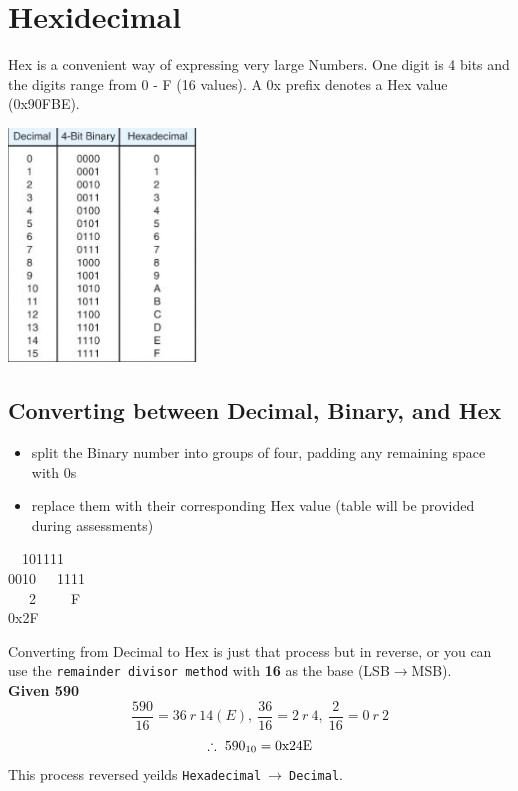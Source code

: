 \documentclass[a4paper,12pt]{article}
\begin{document}
        \section*{Hexidecimal}
        \begin{minipage}{8cm}
            Hex is a convenient way of expressing very large Numbers. One digit is 4 bits and the digits range from 0 - F (16 values). A 0x prefix denotes a Hex value (0x90FBE).    
        \end{minipage}
        \hspace{20pt}
        \begin{minipage}{10cm}
            \includegraphics[width=5cm]{Hex tables.JPG}
        \end{minipage}
        \subsection*{Converting between Decimal, Binary, and Hex} 
        \begin{minipage}{10cm}
            \begin{itemize}
                \item split the Binary number into groups of four, padding any remaining space with 0s
                \item replace them with their corresponding Hex value (table will be provided during assessments)
            \end{itemize}
        \end{minipage}
        \hspace{0.05\textwidth}
        \begin{minipage}{10cm}
            ~~101111\\0010~~~1111\\~~~2~~~~~F\\0x2F
        \end{minipage}
        \vspace{12pt}
        \par Converting from Decimal to Hex is just that process but in reverse, or you can use the \texttt{remainder divisor method} with \textbf{16} as the base (LSB$\rightarrow$MSB).\\\textbf{Given 590} \[\frac{590}{16}=36~r~14(E),~\frac{36}{16}=2~r~4,~\frac{2}{16}=0~r~2\] \[\therefore~590_{10}=0\textnormal{x}24\textnormal{E}\]
        This process reversed yeilds \texttt{Hexadecimal}$~\rightarrow~$\texttt{Decimal}.
\end{document}
